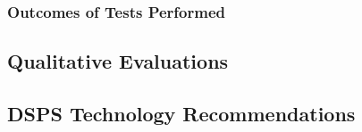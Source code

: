 

\subsubsection{Outcomes of Tests Performed} %
\label{sub:outcomes_of_tests_performed}






\subsection{Qualitative Evaluations} %
\label{sub:qualitative_evaluations}




\subsection{DSPS Technology Recommendations} %
\label{sub:dsps_technology_recommendations}

